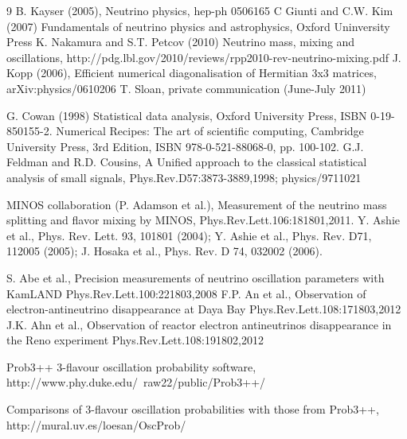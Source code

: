 \documentclass[final]{elsarticle}
\begin{document}
\begin{thebibliography}{9}
  B. Kayser (2005), Neutrino physics, hep-ph 0506165
  C Giunti and C.W. Kim (2007) Fundamentals of neutrino physics and astrophysics, Oxford Uninversity Press
  K. Nakamura and S.T. Petcov (2010) Neutrino mass, mixing and oscillations,
  http://pdg.lbl.gov/2010/reviews/rpp2010-rev-neutrino-mixing.pdf
  J. Kopp (2006), Efficient numerical diagonalisation of Hermitian 3x3 matrices, arXiv:physics/0610206
  T. Sloan, private communication (June-July 2011)


  G. Cowan (1998) Statistical data analysis, 
  Oxford University Press, ISBN 0-19-850155-2.
  Numerical Recipes: The art of scientific computing, 
  Cambridge University Press, 3rd Edition, ISBN 978-0-521-88068-0, pp. 100-102.
  G.J. Feldman and R.D. Cousins,
  A Unified approach to the classical statistical analysis of small signals,
  Phys.Rev.D57:3873-3889,1998; physics/9711021

  MINOS collaboration (P. Adamson et al.),
  Measurement of the neutrino mass splitting and flavor mixing by MINOS,
  Phys.Rev.Lett.106:181801,2011.
  Y. Ashie et al., Phys. Rev. Lett. 93, 101801 (2004);
  Y. Ashie et al., Phys. Rev. D71, 112005 (2005); 
  J. Hosaka et al., Phys. Rev. D 74, 032002 (2006).

  S. Abe et al.,
  Precision measurements of neutrino oscillation parameters with KamLAND
  Phys.Rev.Lett.100:221803,2008
  F.P. An et al.,
  Observation of electron-antineutrino disappearance at Daya Bay
  Phys.Rev.Lett.108:171803,2012
  J.K. Ahn et al.,
  Observation of reactor electron antineutrinos disappearance in the Reno experiment
  Phys.Rev.Lett.108:191802,2012

  Prob3++ 3-flavour oscillation probability software,
  http://www.phy.duke.edu/~raw22/public/Prob3++/

  Comparisons of 3-flavour oscillation probabilities with those from Prob3++,
  http://mural.uv.es/loesan/OscProb/

\end{thebibliography}
\end{document}
